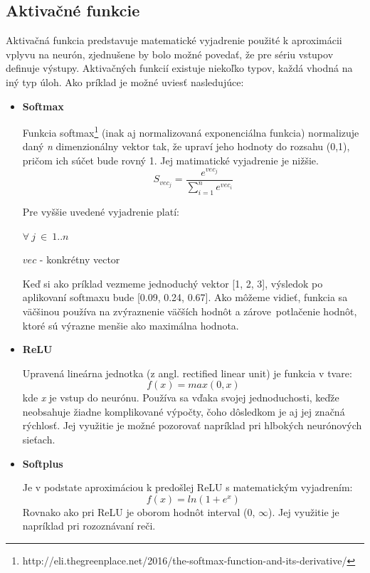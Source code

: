 \subsection{Aktivačné funkcie}\label{activation_functions}

Aktivačná funkcia predstavuje matematické vyjadrenie použité k aproximácii vplyvu na neurón, zjednušene by bolo možné povedať, že pre sériu vstupov definuje výstupy. Aktivačných funkcií existuje niekoľko typov, každá vhodná na iný typ úloh. Ako príklad je možné uviesť nasledujúce: 
	\begin{itemize}
		\item {\textbf{Softmax}}
		
		Funkcia softmax\footnote{http://eli.thegreenplace.net/2016/the-softmax-function-and-its-derivative/} (inak aj normalizovaná exponenciálna funkcia) normalizuje daný  \textit{n} dimenzionálny vektor tak, že upraví jeho hodnoty do rozsahu (0,1), pričom ich súčet bude rovný 1. Jej matimatické vyjadrenie je nižšie. 
		\begin{equation}
		S_{vec_j} = \frac{e^{vec_j}}{\sum_{i=1}^{n}e^{vec_i}}
		\end{equation}
		
		Pre vyššie uvedené vyjadrenie platí:
		
		\(\forall{\ j\ }\in\ 1..n\)
		
		\(vec \) - konkrétny vector
		
		Keď si ako príklad vezmeme jednoduchý vektor [1, 2, 3], výsledok po aplikovaní softmaxu bude [0.09, 0.24, 0.67]. Ako môžeme vidieť, funkcia sa väčšinou používa na zvýraznenie väčších hodnôt a zárove\ potlačenie hodnôt, ktoré sú výrazne menšie ako maximálna hodnota. 
		
		\item {\textbf{ReLU}}
		
		Upravená lineárna jednotka (z angl. rectified linear unit) je funkcia 
		v tvare:
		\begin{equation}
		f(x) = max (0, x)
		\end{equation}
		kde \textit{x} je vstup do neurónu. Používa sa vďaka svojej jednoduchosti, keďže neobsahuje žiadne komplikované výpočty, čoho dôsledkom je aj jej značná rýchlosť. Jej využitie je možné pozorovať napríklad pri hlbokých neurónových sieťach.
		
		\item{\textbf{Softplus}}
		
		Je v podstate aproximáciou k predošlej ReLU s matematickým vyjadrením:
		\begin{equation}
		f(x)=ln (1 + e^x)
		\end{equation}
		Rovnako ako pri ReLU je oborom hodnôt interval (0, \(\infty\)). Jej využitie je napríklad pri rozoznávaní reči.
		

\end{itemize}
